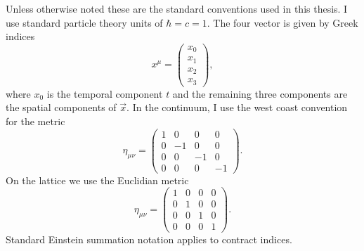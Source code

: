 
Unless otherwise noted these are the standard conventions used in this thesis.
I use standard particle theory units of $\hbar=c=1$.
The four vector is given by Greek indices
\begin{equation}
  x^\mu=\left(\begin{matrix} x_0 \\ x_1 \\ x_2 \\ x_3\end{matrix}\right),
\end{equation}
where $x_0$ is the temporal component $t$ and the remaining three components are the spatial components of $\vec x$.
In the continuum, I use the west coast convention for the metric
\begin{equation}
  \eta_{\mu\nu} = \left(\begin{matrix}1& 0 & 0 & 0 \\
                                      0&-1 & 0 & 0 \\
                                      0& 0 &-1 & 0 \\
                                      0& 0 & 0 &-1\end{matrix}\right).
\end{equation}
On the lattice we use the Euclidian metric
\begin{equation}
  \eta_{\mu\nu} = \left(\begin{matrix}1& 0 & 0 & 0 \\
                                      0& 1 & 0 & 0 \\
                                      0& 0 & 1 & 0 \\
                                      0& 0 & 0 & 1\end{matrix}\right).
\end{equation}
Standard Einstein summation notation applies to contract indices.

